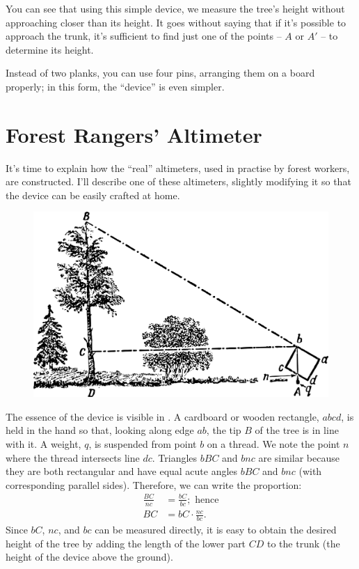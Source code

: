 You can see that using this simple device, we measure the tree's height without approaching closer than its height. It goes without saying that if it's possible to approach the trunk, it's sufficient to find just one of the points -- $A$ or $A'$ -- to determine its height.

Instead of two planks, you can use four pins, arranging them on a board properly; in this form, the ``device'' is even simpler.

\clearpage

\section{Forest Rangers' Altimeter}
\label{sec-1.7}

It's time to explain how the ``real'' altimeters, used in practise by forest workers, are constructed. I'll describe one of these altimeters, slightly modifying it so that the device can be easily crafted at home. 

\begin{figure}[h!]
\centering
\includegraphics[width=\textwidth]{figures/ch-01/fig-01-11.pdf}
\end{figure}


The essence of the device is visible in . A cardboard or wooden rectangle, $abcd$, is held in the hand so that, looking along edge $ab$, the tip $B$ of the tree is in line with it. A weight, $q$, is suspended from point $b$ on a thread. We note the point $n$ where the thread intersects line $dc$. Triangles $bBC$ and $bnc$ are similar because they are both rectangular and have equal acute angles $bBC$ and $bnc$ (with corresponding parallel sides). Therefore, we can write the proportion:
\begin{align*}%
\frac{BC}{nc} & = \frac{bC}{bc}; \,\, \text{hence} \\
BC & = bC \cdot \frac{nc}{bc}.
\end{align*}
Since $bC$, $nc$, and $bc$ can be measured directly, it is easy to obtain the desired height of the tree by adding the length of the lower part $CD$ to the trunk (the height of the device above the ground). 

